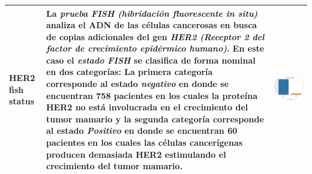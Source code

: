 \begin{table}[!htb]
\begin{threeparttable}
\begin{tabular}{p{2.5cm} p{7cm} p{6.5cm}}
			HER2 fish status
			& La \textit{prueba FISH (hibridación fluorescente in situ)} analiza el ADN de las células cancerosas en busca de copias adicionales del gen \textit{HER2 (Receptor 2 del factor de crecimiento epidérmico humano)}. En este caso el \textit{estado FISH} se clasifica de forma nominal en dos categorías: La primera categoría corresponde al estado \textit{negativo} en donde se encuentran 758 pacientes en los cuales la proteína HER2 no está involucrada en el crecimiento del tumor mamario y la segunda categoría corresponde al estado \textit{Positivo} en donde se encuentran 60 pacientes en los cuales las células cancerígenas producen demasiada HER2 estimulando el crecimiento del tumor mamario. 
			& \begin{center}\includegraphics[width=1\linewidth]{NOTEBOOK/IMAGENES_DESCRIPTIVAS/19_her_2_fish_status}\end{center}
			\\ \hline
		\end{tabular}
	\end{threeparttable}
\end{table}


